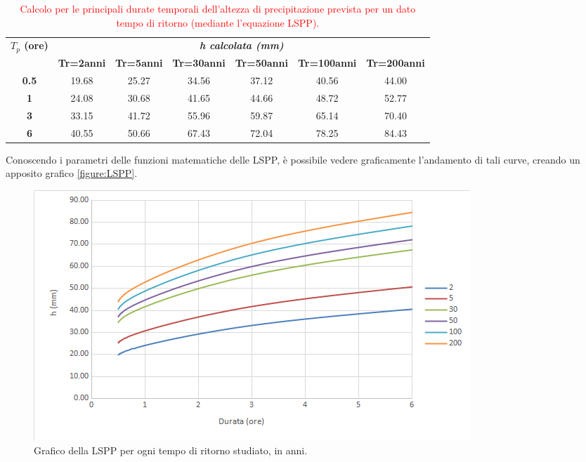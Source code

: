 \begin{table}[H]\centering
    \caption{\textcolor{red}{Calcolo per le principali durate temporali dell'altezza di precipitazione prevista per un dato tempo di ritorno (mediante l'equazione LSPP).}}
    \begin{tabular}{ccccccc}
        \toprule
    \multirow{2}{*}{\textbf{$T_p$ (ore)}} & \multicolumn{6}{c}{\textit{\textbf{h calcolata (mm)}}}  \\
    & \textbf{Tr=2anni} & \textbf{Tr=5anni} & \textbf{Tr=30anni} & \textbf{Tr=50anni} & \textbf{Tr=100anni} & \textbf{Tr=200anni} \\
    \textbf{0.5}                           & 19.68                & 25.27                & 34.56                 & 37.12                 & 40.56                  & 44.00                  \\
    \textbf{1}                             & 24.08                & 30.68                & 41.65                 & 44.66                 & 48.72                  & 52.77                  \\
    \textbf{3}                             & 33.15                & 41.72                & 55.96                 & 59.87                 & 65.14                  & 70.40                  \\
    \textbf{6}                             & 40.55                & 50.66                & 67.43                 & 72.04                 & 78.25                  & 84.43           \\
    \bottomrule      
    \end{tabular}
    \label{table:altezze_ricavate_lspp}
    \end{table}

Conoscendo i parametri delle funzioni matematiche delle LSPP, è possibile vedere graficamente l'andamento di tali curve, creando un apposito grafico \eqref{figure:LSPP}.

\begin{figure}[H]\centering
        \includegraphics[scale=.75]{immagini/LSPP.png}
        \caption{Grafico della LSPP per ogni tempo di ritorno studiato, in anni.}
      \label{figure:LSPP}
\end{figure}

